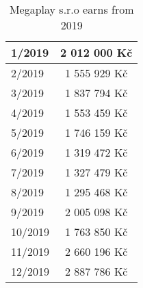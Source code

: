 \newpage
\begin{table}[h!]
    \begin{center}
        \begin{tabular}{ | l | c | }
            \hline
            1/2019 & 2 012 000 Kč \\
            \hline
            2/2019 & 1 555 929 Kč \\
            \hline
            3/2019 & 1 837 794 Kč \\
            \hline
            4/2019 & 1 553 459 Kč \\
            \hline
            5/2019 & 1 746 159 Kč \\
            \hline
            6/2019 & 1 319 472 Kč \\
            \hline
            7/2019 & 1 327 479 Kč \\
            \hline
            8/2019 & 1 295 468 Kč \\
            \hline
            9/2019 & 2 005 098 Kč \\
            \hline
            10/2019 & 1 763 850 Kč \\
            \hline
            11/2019 & 2 660 196 Kč \\
            \hline
            12/2019 & 2 887 786 Kč \\
            \hline
        \end{tabular}
    \end{center}
    \caption{Megaplay s.r.o earns from 2019}
    \label{Megaplay s.r.o earns from 2019}
\end{table}
